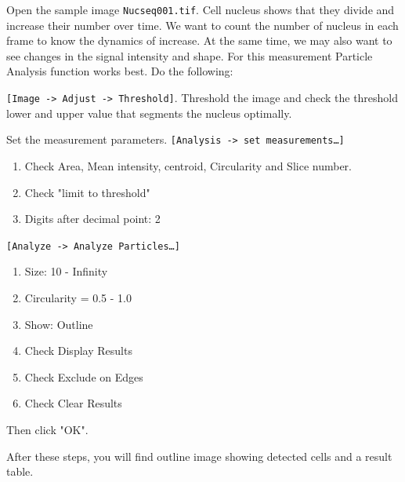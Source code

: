 \documentclass[11pt,a4paper,oneside]{report}
\newcommand{\ijmenu}[1]{\texttt{\small#1}}
\newcommand{\ilcom}[1]{\texttt{\small#1}}
\begin{document}
Open the sample image \ilcom{Nucseq001.tif}. Cell nucleus shows that they divide and 
increase their number over time. We want to count the number of nucleus in each frame to know 
the dynamics of increase. 
At the same time, we may also want to see changes in the signal intensity and shape. 
For this measurement Particle Analysis function works best. Do the following:

\begin{enumerate}
\small{
\item \ijmenu{[Image -> Adjust -> Threshold]}. 
Threshold the image and check the threshold lower and upper value that segments the nucleus optimally. 
\item Set the measurement parameters. \ijmenu{[Analysis -> set measurements\ldots]}
\begin{enumerate}
\item Check Area, Mean intensity, centroid, Circularity and Slice number. 
\item Check "limit to threshold"
\item Digits after decimal point: 2
\end{enumerate}
\item \ijmenu{[Analyze -> Analyze Particles\ldots]}
\begin{enumerate}
\item Size: 10 - Infinity
\item Circularity = 0.5 - 1.0
\item Show: Outline
\item Check Display Results
\item Check Exclude on Edges
\item Check Clear Results
\end{enumerate}
\item Then click "OK". 
}
\end{enumerate}
After these steps, you will find outline image showing detected cells and a result table. 
\end{document}
